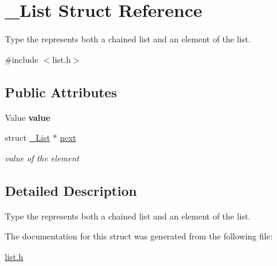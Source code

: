 \hypertarget{struct___list}{}\section{\+\_\+\+List Struct Reference}
\label{struct___list}


Type the represents both a chained list and an element of the list.  




{\ttfamily \#include $<$list.\+h$>$}

\subsection*{Public Attributes}
\begin{DoxyCompactItemize}
\item 
\mbox{\label{struct___list_a04d237ff59ec37ecf622b24799e21ca7}} 
Value {\bfseries value}
\item 
\mbox{\label{struct___list_a0958fa1357a2c1c8fd6e8a3f3156c9b1}} 
struct \hyperlink{struct___list}{\+\_\+\+List} $\ast$ \hyperlink{struct___list_a0958fa1357a2c1c8fd6e8a3f3156c9b1}{next}
\begin{DoxyCompactList}\small\item\em value of the element \end{DoxyCompactList}\end{DoxyCompactItemize}


\subsection{Detailed Description}
Type the represents both a chained list and an element of the list. 

The documentation for this struct was generated from the following file\+:\begin{DoxyCompactItemize}
\item 
\hyperlink{list_8h}{list.\+h}\end{DoxyCompactItemize}
